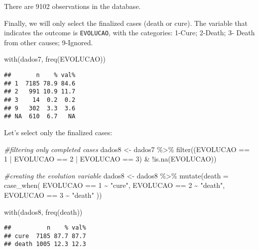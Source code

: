 \documentclass[
]{article}
\newenvironment{Shaded}{\begin{snugshade}}{\end{snugshade}}
\newcommand{\AttributeTok}[1]{\textcolor[rgb]{0.77,0.63,0.00}{#1}}
\newcommand{\CommentTok}[1]{\textcolor[rgb]{0.56,0.35,0.01}{\textit{#1}}}
\newcommand{\DecValTok}[1]{\textcolor[rgb]{0.00,0.00,0.81}{#1}}
\newcommand{\FunctionTok}[1]{\textcolor[rgb]{0.00,0.00,0.00}{#1}}
\newcommand{\NormalTok}[1]{#1}
\newcommand{\OtherTok}[1]{\textcolor[rgb]{0.56,0.35,0.01}{#1}}
\newcommand{\SpecialCharTok}[1]{\textcolor[rgb]{0.00,0.00,0.00}{#1}}
\newcommand{\StringTok}[1]{\textcolor[rgb]{0.31,0.60,0.02}{#1}}
\begin{document}
There are 9102 observations in the database.

Finally, we will only select the finalized cases (death or cure). The
variable that indicates the outcome is \texttt{EVOLUCAO}, with the
categories: 1-Cure; 2-Death; 3- Death from other causes; 9-Ignored.

\begin{Shaded}
\begin{Highlighting}[]
\FunctionTok{with}\NormalTok{(dados7, }\FunctionTok{freq}\NormalTok{(EVOLUCAO))}
\end{Highlighting}
\end{Shaded}

\begin{verbatim}
##       n    % val%
## 1  7185 78.9 84.6
## 2   991 10.9 11.7
## 3    14  0.2  0.2
## 9   302  3.3  3.6
## NA  610  6.7   NA
\end{verbatim}

Let's select only the finalized cases:

\begin{Shaded}
\begin{Highlighting}[]
\CommentTok{\#filtering only completed cases}
\NormalTok{dados8 }\OtherTok{\textless{}{-}}\NormalTok{ dados7 }\SpecialCharTok{\%\textgreater{}\%} 
  \FunctionTok{filter}\NormalTok{((EVOLUCAO }\SpecialCharTok{==} \DecValTok{1} \SpecialCharTok{|}\NormalTok{ EVOLUCAO }\SpecialCharTok{==} \DecValTok{2} \SpecialCharTok{|}\NormalTok{ EVOLUCAO }\SpecialCharTok{==} \DecValTok{3}\NormalTok{) }\SpecialCharTok{\&} \SpecialCharTok{!}\FunctionTok{is.na}\NormalTok{(EVOLUCAO))}


\CommentTok{\#creating the evolution variable}
\NormalTok{dados8 }\OtherTok{\textless{}{-}}\NormalTok{ dados8 }\SpecialCharTok{\%\textgreater{}\%} 
  \FunctionTok{mutate}\NormalTok{(}\AttributeTok{death =} \FunctionTok{case\_when}\NormalTok{(}
\NormalTok{    EVOLUCAO }\SpecialCharTok{==} \DecValTok{1} \SpecialCharTok{\textasciitilde{}} \StringTok{"cure"}\NormalTok{, }
\NormalTok{    EVOLUCAO }\SpecialCharTok{==} \DecValTok{2} \SpecialCharTok{\textasciitilde{}} \StringTok{"death"}\NormalTok{,}
\NormalTok{    EVOLUCAO }\SpecialCharTok{==} \DecValTok{3} \SpecialCharTok{\textasciitilde{}} \StringTok{"death"}
\NormalTok{  ))}

\FunctionTok{with}\NormalTok{(dados8, }\FunctionTok{freq}\NormalTok{(death))}
\end{Highlighting}
\end{Shaded}

\begin{verbatim}
##          n    % val%
## cure  7185 87.7 87.7
## death 1005 12.3 12.3
\end{verbatim}
\end{document}
